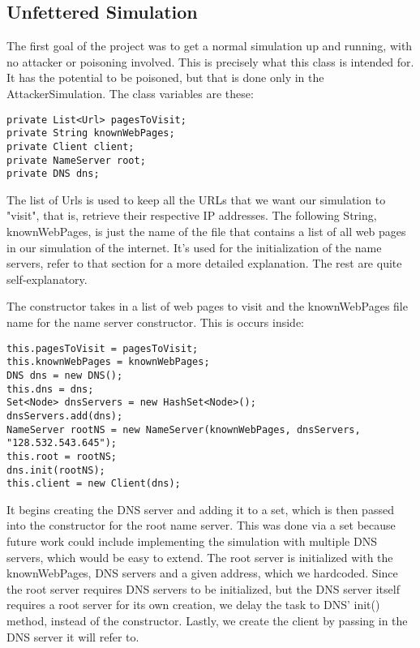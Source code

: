 \documentclass[a4paper, 12pt]{article} %
\begin{document}
\subsection*{Unfettered Simulation}

The first goal of the project was to get a normal simulation up and running, with no attacker or poisoning involved. This is precisely what this class is intended for. It has the potential to be poisoned, but that is done only in the AttackerSimulation. The class variables are these:

\begin{lstlisting}
private List<Url> pagesToVisit;
private String knownWebPages;
private Client client;
private NameServer root;
private DNS dns;
\end{lstlisting}

The list of Urls is used to keep all the URLs that we want our simulation to "visit", that is, retrieve their respective IP addresses. The following String, knownWebPages, is just the name of the file that contains a list of all web pages in our simulation of the internet. It's used for the initialization of the name servers, refer to that section for a more detailed explanation. The rest are quite self-explanatory.

The constructor takes in a list of web pages to visit and the knownWebPages file name for the name server constructor. This is occurs inside:
\begin{lstlisting}
this.pagesToVisit = pagesToVisit;
this.knownWebPages = knownWebPages;
DNS dns = new DNS();
this.dns = dns;
Set<Node> dnsServers = new HashSet<Node>();
dnsServers.add(dns);
NameServer rootNS = new NameServer(knownWebPages, dnsServers, "128.532.543.645");
this.root = rootNS;
dns.init(rootNS);
this.client = new Client(dns);
\end{lstlisting}

It begins creating the DNS server and adding it to a set, which is then passed into the constructor for the root name server. This was done via a set because future work could include implementing the simulation with multiple DNS servers, which would be easy to extend. The root server is initialized with the knownWebPages, DNS servers and a given address, which we hardcoded. Since the root server requires DNS servers to be initialized, but the DNS server itself requires a root server for its own creation, we delay the task to DNS’ init() method, instead of the constructor. Lastly, we create the client by passing in the DNS server it will refer to.
\end{document}
